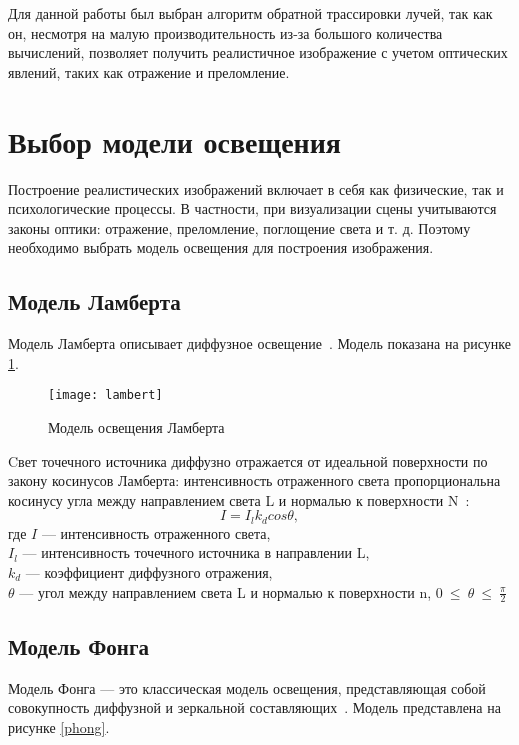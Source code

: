 Для данной работы был выбран алгоритм обратной трассировки лучей, так
как он, несмотря на малую производительность из-за большого количества
вычислений, позволяет получить реалистичное изображение с учетом оптических
явлений, таких как отражение и преломление.

\section{Выбор модели освещения}

Построение реалистических изображений включает в себя как физические,
так и психологические процессы. В частности, при визуализации сцены
учитываются законы оптики: отражение, преломление, поглощение света и т. д.
Поэтому необходимо выбрать модель освещения для построения изображения.

\subsection{Модель Ламберта}

Модель Ламберта описывает диффузное освещение~\cite{rojers}. Модель показана на рисунке \ref{lambert}.

\begin{figure}[H]
	\centering
	\texttt{[image: lambert]}
	\caption{Модель освещения Ламберта}
	\label{lambert}
\end{figure}

Cвет точечного источника диффузно отражается от идеальной поверхности по закону косинусов Ламберта: интенсивность отраженного света пропорциональна косинусу угла между направлением света L и нормалью к поверхности N~\cite{rojers}:
\begin{equation}\label{lambert_eq}
	I = I_l k_d cos \theta,
\end{equation}
где $I$ --- интенсивность отраженного света,\\
\text{~~~~~~}$I_l$ --- интенсивность точечного источника в направлении L,\\
\text{~~~~~~}$k_d$ --- коэффициент диффузного отражения,\\
\text{~~~~~~}$\theta$ --- угол между направлением света L и нормалью к поверхности n, $0~\le~\theta~\le~\frac{\pi}{2}$

\subsection{Модель Фонга}

Модель Фонга --- это классическая модель освещения, представляющая
собой совокупность диффузной и зеркальной составляющих~\cite{rojers}. Модель представлена на рисунке \ref{phong}.

